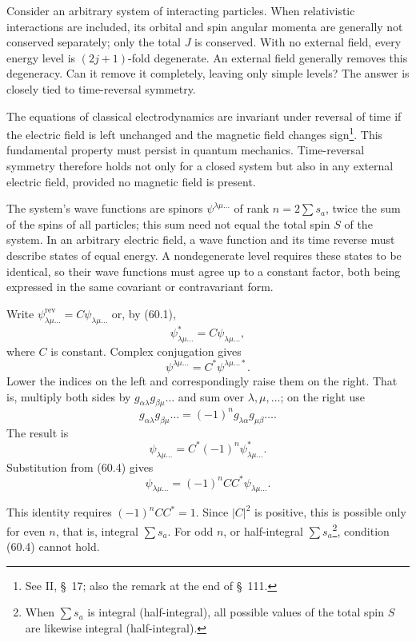 Consider an arbitrary system of interacting particles. When relativistic
interactions are included, its orbital and spin angular momenta are generally
not conserved separately; only the total $J$ is conserved. With no external
field, every energy level is $(2j+1)$-fold degenerate. An external field
generally removes this degeneracy. Can it remove it completely, leaving only
simple levels? The answer is closely tied to time-reversal symmetry.

The equations of classical electrodynamics are invariant under reversal of
time if the electric field is left unchanged and the magnetic field changes
sign\footnote{See II, \S~17; also the remark at the end of \S~111.}. This
fundamental property must persist in quantum mechanics. Time-reversal symmetry
therefore holds not only for a closed system but also in any external electric
field, provided no magnetic field is present.

The system's wave functions are spinors $\psi^{\lambda\mu\ldots}$ of rank
$n=2\sum s_a$, twice the sum of the spins of all particles; this sum need not
equal the total spin $S$ of the system. In an arbitrary electric field, a wave
function and its time reverse must describe states of equal energy. A
nondegenerate level requires these states to be identical, so their wave
functions must agree up to a constant factor, both being expressed in the
same covariant or contravariant form.

Write $\psi^{\text{rev}}_{\lambda\mu\ldots}
=C\psi_{\lambda\mu\ldots}$ or, by (60.1),
\begin{equation}
 \psi_{\lambda\mu\ldots}^*=C\psi_{\lambda\mu\ldots},
 \tag{60.4}
\end{equation}
where $C$ is constant. Complex conjugation gives
\[
 \psi^{\lambda\mu\ldots}=C^*\psi^{\lambda\mu\ldots*}.
\]
Lower the indices on the left and correspondingly raise them on the right.
That is, multiply both sides by
$g_{\alpha\lambda}g_{\beta\mu}\ldots$ and sum over
$\lambda,\mu,\ldots$; on the right use
\[
 g_{\alpha\lambda}g_{\beta\mu}\ldots
 =(-1)^n g_{\lambda\alpha}g_{\mu\beta}\ldots.
\]
The result is
\[
 \psi_{\lambda\mu\ldots}=C^*(-1)^n\psi_{\lambda\mu\ldots}^*.
\]
Substitution from (60.4) gives
\[
 \psi_{\lambda\mu\ldots}=(-1)^nCC^*\psi_{\lambda\mu\ldots}.
\]

This identity requires $(-1)^nCC^*=1$. Since $|C|^2$ is positive, this is
possible only for even $n$, that is, integral $\sum s_a$. For odd $n$, or
half-integral $\sum s_a$\footnote{When $\sum s_a$ is integral
(half-integral), all possible values of the total spin $S$ are likewise
integral (half-integral).}, condition (60.4) cannot hold.

